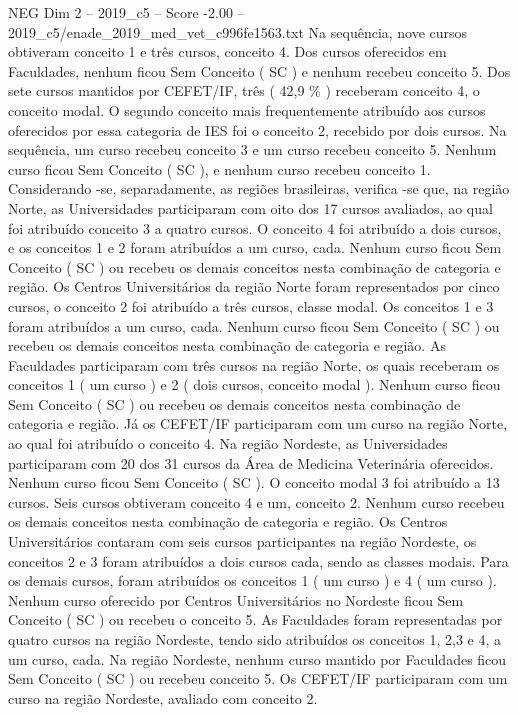 \begin{textsample}{NEG Dim 2 – 2019\_c5 – Score -2.00 – 2019\_c5/enade\_2019\_med\_vet\_c996fe1563.txt}
Na sequência, nove cursos obtiveram conceito 1 e três cursos, conceito 4.
Dos cursos oferecidos em Faculdades, nenhum ficou Sem Conceito ( SC ) e nenhum recebeu conceito 5.
Dos sete cursos mantidos por CEFET/IF, três ( 42,9 \% ) receberam conceito 4, o conceito modal.
O segundo conceito mais frequentemente atribuído aos cursos oferecidos por essa categoria de IES foi o conceito 2, recebido por dois cursos.
Na sequência, um curso recebeu conceito 3 e um curso recebeu conceito 5.
Nenhum curso ficou Sem Conceito ( SC ), e nenhum curso recebeu conceito 1.
Considerando -se, separadamente, as regiões brasileiras, verifica -se que, na região Norte, as Universidades participaram com oito dos 17 cursos avaliados, ao qual foi atribuído conceito 3 a quatro cursos.
O conceito 4 foi atribuído a dois cursos, e os conceitos 1 e 2 foram atribuídos a um curso, cada.
Nenhum curso ficou Sem Conceito ( SC ) ou recebeu os demais conceitos nesta combinação de categoria e região.
Os Centros Universitários da região Norte foram representados por cinco cursos, o conceito 2 foi atribuído a três cursos, classe modal.
Os conceitos 1 e 3 foram atribuídos a um curso, cada.
Nenhum curso ficou Sem Conceito ( SC ) ou recebeu os demais conceitos nesta combinação de categoria e região.
As Faculdades participaram com três cursos na região Norte, os quais receberam os conceitos 1 ( um curso ) e 2 ( dois cursos, conceito modal ).
Nenhum curso ficou Sem Conceito ( SC ) ou recebeu os demais conceitos nesta combinação de categoria e região.
Já os CEFET/IF participaram com um curso na região Norte, ao qual foi atribuído o conceito 4.
Na região Nordeste, as Universidades participaram com 20 dos 31 cursos da Área de Medicina Veterinária oferecidos.
Nenhum curso ficou Sem Conceito ( SC ).
O conceito modal 3 foi atribuído a 13 cursos.
Seis cursos obtiveram conceito 4 e um, conceito 2.
Nenhum curso recebeu os demais conceitos nesta combinação de categoria e região.
Os Centros Universitários contaram com seis cursos participantes na região Nordeste, os conceitos 2 e 3 foram atribuídos a dois cursos cada, sendo as classes modais.
Para os demais cursos, foram atribuídos os conceitos 1 ( um curso ) e 4 ( um curso ).
Nenhum curso oferecido por Centros Universitários no Nordeste ficou Sem Conceito ( SC ) ou recebeu o conceito 5.
As Faculdades foram representadas por quatro cursos na região Nordeste, tendo sido atribuídos os conceitos 1, 2,3 e 4, a um curso, cada.
Na região Nordeste, nenhum curso mantido por Faculdades ficou Sem Conceito ( SC ) ou recebeu conceito 5.
Os CEFET/IF participaram com um curso na região Nordeste, avaliado com conceito 2.

\end{textsample}
